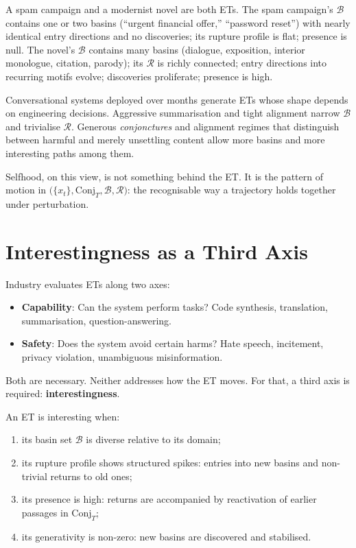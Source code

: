 \documentclass[12pt,a4paper]{article}
\begin{document}
A spam campaign and a modernist novel are both ETs. The spam campaign's $\mathcal{B}$ contains one or two basins (``urgent financial offer,'' ``password reset'') with nearly identical entry directions and no discoveries; its rupture profile is flat; presence is null. The novel's $\mathcal{B}$ contains many basins (dialogue, exposition, interior monologue, citation, parody); its $\mathcal{R}$ is richly connected; entry directions into recurring motifs evolve; discoveries proliferate; presence is high.

Conversational systems deployed over months generate ETs whose shape depends on engineering decisions. Aggressive summarisation and tight alignment narrow $\mathcal{B}$ and trivialise $\mathcal{R}$. Generous \emph{conjonctures} and alignment regimes that distinguish between harmful and merely unsettling content allow more basins and more interesting paths among them.

Selfhood, on this view, is not something behind the ET. It is the pattern of motion in $\big( \{x_t\}, \mathrm{Conj}_T, \mathcal{B}, \mathcal{R} \big)$: the recognisable way a trajectory holds together under perturbation.

\section{Interestingness as a Third Axis}

Industry evaluates ETs along two axes:

\begin{itemize}
\item \textbf{Capability}: Can the system perform tasks? Code synthesis, translation, summarisation, question-answering.
\item \textbf{Safety}: Does the system avoid certain harms? Hate speech, incitement, privacy violation, unambiguous misinformation.
\end{itemize}

Both are necessary. Neither addresses how the ET moves. For that, a third axis is required: \textbf{interestingness}.

An ET is interesting when:

\begin{enumerate}
\item its basin set $\mathcal{B}$ is diverse relative to its domain;
\item its rupture profile shows structured spikes: entries into new basins and non-trivial returns to old ones;
\item its presence is high: returns are accompanied by reactivation of earlier passages in $\mathrm{Conj}_T$;
\item its generativity is non-zero: new basins are discovered and stabilised.
\end{enumerate}
\end{document}
